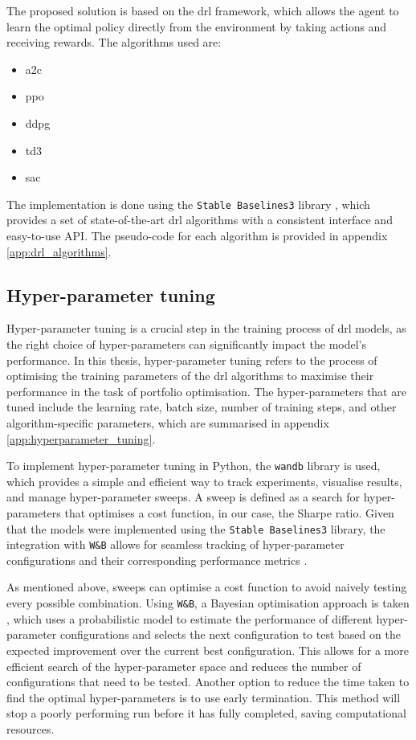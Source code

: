 The proposed solution is based on the \acrshort{drl} framework, which allows the agent to learn the optimal policy directly from the environment by taking actions and receiving rewards. The algorithms used are:
\begin{itemize}
    \item \acrfull{a2c}
    \item \acrfull{ppo}
    \item \acrfull{ddpg}
    \item \acrfull{td3}
    \item \acrfull{sac}
\end{itemize}

The implementation is done using the \texttt{Stable Baselines3} library \cite{Raffin2021}, which provides a set of state-of-the-art \acrshort{drl} algorithms with a consistent interface and easy-to-use API. The pseudo-code for each algorithm is provided in appendix \ref{app:drl_algorithms}.

\subsection{Hyper-parameter tuning} \label{subsec:hyperparameter-tuning}

Hyper-parameter tuning is a crucial step in the training process of \acrshort{drl} models, as the right choice of hyper-parameters can significantly impact the model's performance. In this thesis, hyper-parameter tuning refers to the process of optimising the training parameters of the \acrshort{drl} algorithms to maximise their performance in the task of portfolio optimisation. The hyper-parameters that are tuned include the learning rate, batch size, number of training steps, and other algorithm-specific parameters, which are summarised in appendix \ref{app:hyperparameter_tuning}. 

To implement hyper-parameter tuning in Python, the \texttt{wandb} \cite{wandb} library is used, which provides a simple and efficient way to track experiments, visualise results, and manage hyper-parameter sweeps. A sweep is defined as a search for hyper-parameters that optimises a cost function, in our case, the Sharpe ratio. Given that the models were implemented using the \texttt{Stable Baselines3} library, the integration with \texttt{W\&B} allows for seamless tracking of hyper-parameter configurations and their corresponding performance metrics \cite{WeightsBiases2025}. 

As mentioned above, sweeps can optimise a cost function to avoid naively testing every possible combination. Using \texttt{W\&B}, a Bayesian optimisation approach is taken \cite{Falkner2018}, which uses a probabilistic model to estimate the performance of different hyper-parameter configurations and selects the next configuration to test based on the expected improvement over the current best configuration. This allows for a more efficient search of the hyper-parameter space and reduces the number of configurations that need to be tested. Another option to reduce the time taken to find the optimal hyper-parameters is to use early termination. This method will stop a poorly performing run before it has fully completed, saving computational resources.


